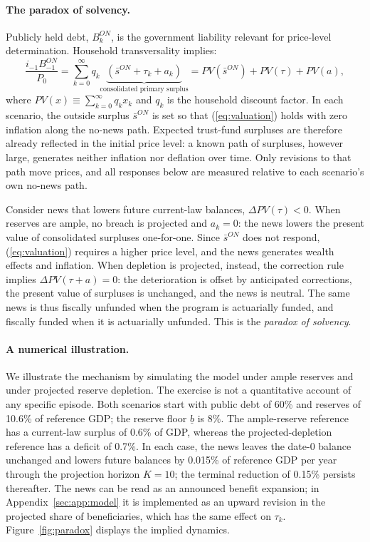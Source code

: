 \documentclass[12pt]{article}%
\theoremstyle{remark}
\begin{document}
\paragraph{The paradox of solvency.}
Publicly held debt, $B^{ON}_k$, is the government liability relevant for price-level determination. Household transversality implies:
\begin{equation}\label{eq:valuation}
\frac{i_{-1}B^{ON}_{-1}}{P_0}
= \sum_{k=0}^{\infty} q_k
\underbrace{\left(\bar s^{ON} + \tau_k + a_k\right)}_{\text{consolidated primary surplus}}
= PV(\bar s^{ON}) + PV(\tau) + PV(a),
\end{equation}
where $PV(x)\equiv\sum_{k=0}^\infty q_k x_k$ and $q_k$ is the household discount
factor.  In each scenario, the outside surplus $\bar s^{ON}$ is set so that (\ref{eq:valuation}) holds with zero inflation along the no-news path. 
Expected trust-fund surpluses are therefore already reflected in the initial price level: a known path of surpluses, however large, generates neither inflation nor deflation over time. Only revisions to that path move prices, and all responses below are measured relative to each scenario's own no-news path.

Consider news that lowers future current-law balances, $\Delta PV(\tau)<0$. When
reserves are ample, no breach is projected and $a_k=0$: the news lowers the
present value of consolidated surpluses one-for-one. Since $\bar s^{ON}$ does not
respond, (\ref{eq:valuation}) requires a higher price level, and the news
generates wealth effects and inflation. When depletion is projected, instead, the
correction rule implies $\Delta PV(\tau+a)=0$: the deterioration is offset by
anticipated corrections, the present value of surpluses is unchanged, and the
news is neutral. The same news is thus fiscally unfunded when the program is
actuarially funded, and fiscally funded when it is actuarially unfunded. This is
the \emph{paradox of solvency}.

\paragraph{A numerical illustration.}
We illustrate the mechanism by simulating the model under ample reserves and
under projected reserve depletion. The exercise is not a quantitative account of
any specific episode. Both scenarios start with public debt of 60\% and reserves
of 10.6\% of reference GDP; the reserve floor $\underline{b}$ is 8\%. The
ample-reserve reference has a current-law surplus of 0.6\% of GDP, whereas the
projected-depletion reference has a deficit of 0.7\%. In each case, the news
leaves the date-0 balance unchanged and lowers future balances by 0.015\% of
reference GDP per year through the projection horizon $K=10$; the terminal
reduction of 0.15\% persists thereafter. The news can be read as an announced
benefit expansion; in Appendix~\ref{sec:app:model} it is implemented as an upward
revision in the projected share of beneficiaries, which has the same effect on
$\tau_k$. Figure~\ref{fig:paradox} displays the implied dynamics.
\end{document}
